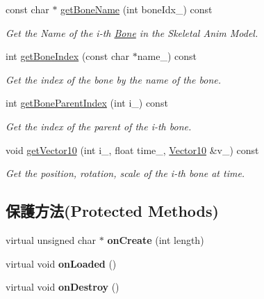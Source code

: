 \begin{DoxyCompactItemize}
\item 
const char $\ast$ \hyperlink{class_magnum_1_1endif_1_1_resource_a4f93bb030bdfb8a6671fa2b1e78f64a7}{get\+Bone\+Name} (int bone\+Idx\+\_\+) const 
\begin{DoxyCompactList}\small\item\em Get the Name of the i-\/th \hyperlink{class_magnum_1_1endif_1_1_bone}{Bone} in the Skeletal Anim Model. \end{DoxyCompactList}\item 
int \hyperlink{class_magnum_1_1endif_1_1_resource_ab192fe82ebc9bd2816c670d307868e41}{get\+Bone\+Index} (const char $\ast$name\+\_\+) const 
\begin{DoxyCompactList}\small\item\em Get the index of the bone by the name of the bone. \end{DoxyCompactList}\item 
int \hyperlink{class_magnum_1_1endif_1_1_resource_a5516ce3c95de6dfdf797e6adb93d5be6}{get\+Bone\+Parent\+Index} (int i\+\_\+) const 
\begin{DoxyCompactList}\small\item\em Get the index of the parent of the i-\/th bone. \end{DoxyCompactList}\item 
void \hyperlink{class_magnum_1_1endif_1_1_resource_a8b9283e0672ba06142d35529d2447aac}{get\+Vector10} (int i\+\_\+, float time\+\_\+, \hyperlink{class_magnum_1_1_vector10}{Vector10} \&v\+\_\+) const 
\begin{DoxyCompactList}\small\item\em Get the position, rotation, scale of the i-\/th bone at time. \end{DoxyCompactList}\end{DoxyCompactItemize}
\subsection*{保護方法(Protected Methods)}
\begin{DoxyCompactItemize}
\item 
virtual unsigned char $\ast$ {\bfseries on\+Create} (int length)\hypertarget{class_magnum_1_1endif_1_1_resource_afdbe368ec83a9babf13efc632d70dbb9}{}\label{class_magnum_1_1endif_1_1_resource_afdbe368ec83a9babf13efc632d70dbb9}

\item 
virtual void {\bfseries on\+Loaded} ()\hypertarget{class_magnum_1_1endif_1_1_resource_a3bbc76014b11c34ae5741e588142d5bc}{}\label{class_magnum_1_1endif_1_1_resource_a3bbc76014b11c34ae5741e588142d5bc}

\item 
virtual void {\bfseries on\+Destroy} ()\hypertarget{class_magnum_1_1endif_1_1_resource_a7e9a02b06699ced81585549dcb9c0362}{}\label{class_magnum_1_1endif_1_1_resource_a7e9a02b06699ced81585549dcb9c0362}

\end{DoxyCompactItemize}

